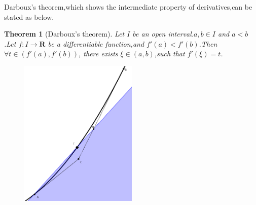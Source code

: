 \documentclass{article} \usepackage{maa-monthly}
\theoremstyle{theorem} \newtheorem*{theorem}{Theorem}
\theoremstyle{definition} \newtheorem*{definition}{Definition}
\begin{document}
Darboux's theorem,which shows the intermediate property of
derivatives,can be stated as below.
\begin{theorem}[Darboux's theorem]
Let $I$ be an open interval.$a,b\in I$ and $a<b$.Let $f:I\to \mathbf{R}$ be a
differentiable function,and $f'(a)<f'(b)$.Then $\forall t\in
(f'(a),f'(b))$, there exists $\xi\in
(a,b)$,such that $f'(\xi)=t$.
\end{theorem}
\begin{figure}[h]\centering
\includegraphics[width=0.5\textwidth]{A_geometric_proof_of_Darboux_theorem1.png}
  \caption{}
  \label{fig:1}
\end{figure}
\end{document}
